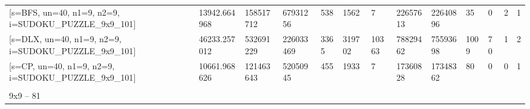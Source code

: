 \documentclass[10pt,twocolumn]{article}
\begin{document}
\begin{table}[p]
{\begin{tabular}{@{}lllllllllllll@{}}
    {\color[HTML]{000000} {[}s=BFS, un=40, n1=9, n2=9, i=SUDOKU\_PUZZLE\_9x9\_101{]}}     & {\color[HTML]{000000} 13942.664968}  & {\color[HTML]{000000} 158517712}    & {\color[HTML]{000000} 67931256}     & {\color[HTML]{000000} 538}            & {\color[HTML]{000000} 1562}         & {\color[HTML]{000000} 7}           & {\color[HTML]{000000} 22657613}     & {\color[HTML]{000000} 22640896}      & {\color[HTML]{000000} 35}     & {\color[HTML]{000000} 0}        & {\color[HTML]{000000} 2}         & {\color[HTML]{000000} 1}              \\
    {\color[HTML]{000000} {[}s=DLX, un=40, n1=9, n2=9, i=SUDOKU\_PUZZLE\_9x9\_101{]}}     & {\color[HTML]{000000} 46233.257012}  & {\color[HTML]{000000} 532691229}    & {\color[HTML]{000000} 226033469}    & {\color[HTML]{000000} 3365}           & {\color[HTML]{000000} 319702}       & {\color[HTML]{000000} 10363}       & {\color[HTML]{000000} 78829462}     & {\color[HTML]{000000} 75593698}      & {\color[HTML]{000000} 1009}   & {\color[HTML]{000000} 70}       & {\color[HTML]{000000} 1}         & {\color[HTML]{000000} 2}              \\
    {\color[HTML]{000000} {[}s=CP, un=40, n1=9, n2=9, i=SUDOKU\_PUZZLE\_9x9\_101{]}}      & {\color[HTML]{000000} 10661.968626}  & {\color[HTML]{000000} 121463643}    & {\color[HTML]{000000} 52050945}     & {\color[HTML]{000000} 455}            & {\color[HTML]{000000} 1933}         & {\color[HTML]{000000} 7}           & {\color[HTML]{000000} 17360828}     & {\color[HTML]{000000} 17348362}      & {\color[HTML]{000000} 80}     & {\color[HTML]{000000} 0}        & {\color[HTML]{000000} 0}         & {\color[HTML]{000000} 1}              \\
    {\color[HTML]{000000} }                                                               & {\color[HTML]{000000} }              & {\color[HTML]{000000} }             & {\color[HTML]{000000} }             & {\color[HTML]{000000} }               & {\color[HTML]{000000} }             & {\color[HTML]{000000} }            & {\color[HTML]{000000} }             & {\color[HTML]{000000} }              & {\color[HTML]{000000} }       & {\color[HTML]{000000} }         & {\color[HTML]{000000} }          & {\color[HTML]{000000} }               \\
    {\color[HTML]{000000} 9x9 – 81}                                                       & {\color[HTML]{000000} }              & {\color[HTML]{000000} }             & {\color[HTML]{000000} }             & {\color[HTML]{000000} }               & {\color[HTML]{000000} }             & {\color[HTML]{000000} }            & {\color[HTML]{000000} }             & {\color[HTML]{000000} }              & {\color[HTML]{000000} }       & {\color[HTML]{000000} }         & {\color[HTML]{000000} }          & {\color[HTML]{000000} }               \\

\end{tabular}}
\end{table}
\end{document}
